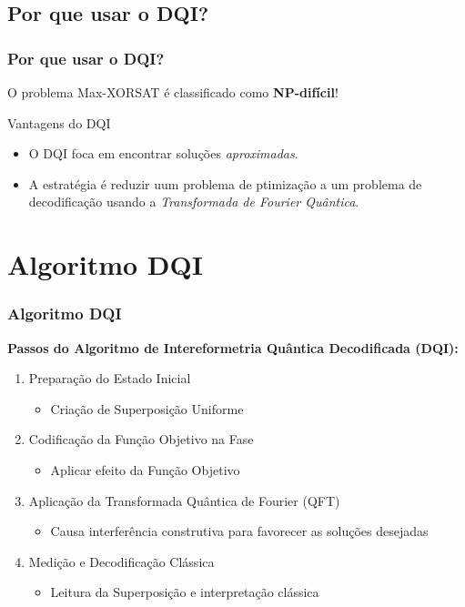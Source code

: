 \documentclass[aspectratio=169]{beamer}
\begin{document}
\subsection{Por que usar o DQI?}
\begin{frame}
  \frametitle{Por que usar o DQI?}
  O problema Max-XORSAT é classificado como \textbf{NP-difícil}!

  \vfill
  \begin{block}{Vantagens do DQI}
    \begin{itemize}
      \item O DQI foca em encontrar soluções \textit{aproximadas}.
      \item A estratégia é reduzir uum problema de ptimização a um problema de decodificação usando a \textit{Transformada de Fourier Quântica}.
    \end{itemize}
  \end{block}
\end{frame}


\section{Algoritmo DQI}
\begin{frame}
    \frametitle{Algoritmo DQI}

    \textbf{Passos do Algoritmo de Intereformetria Quântica Decodificada (DQI):}
    \vfill

    \begin{enumerate}
        \item Preparação do Estado Inicial
            \begin{itemize}
                \item Criação de Superposição Uniforme
            \end{itemize}
        \vfill
        \item Codificação da Função Objetivo na Fase
            \begin{itemize}
                \item Aplicar efeito da Função Objetivo
            \end{itemize}
        \vfill
        \item Aplicação da Transformada Quântica de Fourier (QFT)
            \begin{itemize}
                \item Causa interferência construtiva para favorecer as soluções desejadas
            \end{itemize}
        \vfill
        \item Medição e Decodificação Clássica
            \begin{itemize}
                \item Leitura da Superposição e interpretação clássica
            \end{itemize}
    \end{enumerate}
\end{frame}
\end{document}
